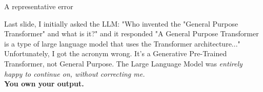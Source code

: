 \documentclass[aspectratio=169]{beamer}
\begin{document}
\begin{frame}{A representative error}

Last slide, I initially asked the LLM: "Who invented the "General Purpose Transformer" and what is it?" and it responded "A General Purpose Transformer is a type of large language model that uses the Transformer architecture..."\\[1em]

Unfortunately, I got the acronym wrong. It's a Generative Pre-Trained Transformer, not General Purpose. The Large Language Model was \textit{entirely happy to continue on, without correcting me.}\\[1em]

\textbf{You own your output.}


    
\end{frame}
\end{document}
